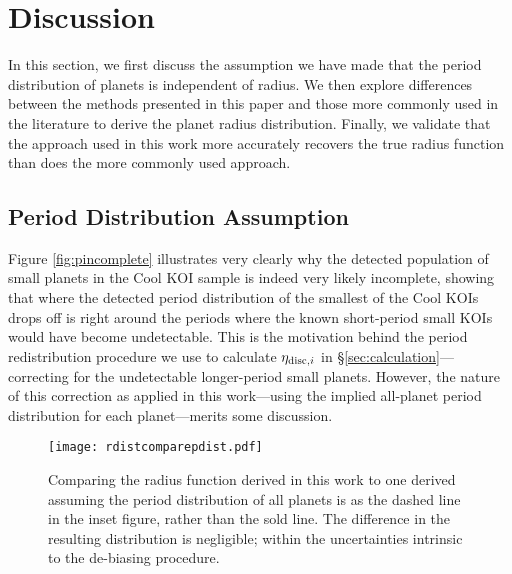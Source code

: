 \documentclass[iop]{emulateapj}
\begin{document}
\section{Discussion}
\label{sec:discussion}

In this section, we first discuss the assumption we have made that the period distribution of planets is independent of radius.  We then explore differences between the methods presented in this paper and those more commonly used in the literature to derive the planet radius distribution.  Finally, we validate that the approach used in this work more accurately recovers the true radius function than does the more commonly used approach.



\subsection{Period Distribution Assumption}
\label{sec:perdistassumption}

Figure \ref{fig:pincomplete} illustrates very clearly why the detected population of small planets in the Cool KOI sample is indeed very likely incomplete, showing that where the detected period distribution of the smallest of the Cool KOIs drops off is right around the periods where the known short-period small KOIs would have become undetectable.  This is the motivation behind the period redistribution procedure we use to calculate $\eta_{{\rm disc},i}$ in \S\ref{sec:calculation}---correcting for the undetectable longer-period small planets.  However, the nature of this correction as applied in this work---using the implied all-planet period distribution for each planet---merits some discussion.


\begin{figure}[t!]
   \centering
   \texttt{[image: rdistcomparepdist.pdf]} %
   \caption{Comparing the radius function derived in this work to one derived assuming the period distribution of all planets is as the dashed line in the inset figure, rather than the sold line.  The difference in the resulting distribution is negligible; within the uncertainties intrinsic to the de-biasing procedure.}
   \label{fig:rdistcomparepdist}
\end{figure}
\end{document}
